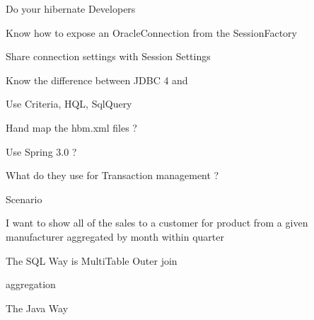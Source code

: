 Do your hibernate Developers

	Know how to expose an OracleConnection from the SessionFactory

	Share connection settings with Session Settings

	Know the difference between JDBC 4 and 

	Use Criteria, HQL, SqlQuery

	Hand map the hbm.xml files ?

	Use Spring 3.0 ?

	What do they use for Transaction management ?

	


Scenario

I want to show all of the sales to a customer for product from a given manufacturer aggregated by month within quarter

The SQL Way is 
	MultiTable Outer join

	aggregation



	

The Java Way